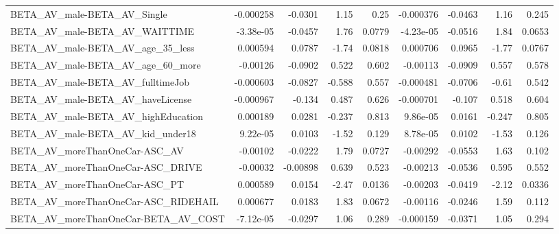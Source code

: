 \begin{tabular}{lrrrrrrrr}
BETA\_AV\_male-BETA\_AV\_Single                        &   -0.000258 &      -0.0301 &     1.15 &     0.25 &  -0.000376 &     -0.0463 &         1.16 &         0.245 \\
BETA\_AV\_male-BETA\_AV\_WAITTIME                      &   -3.38e-05 &      -0.0457 &     1.76 &   0.0779 &  -4.23e-05 &     -0.0516 &         1.84 &        0.0653 \\
BETA\_AV\_male-BETA\_AV\_age\_35\_less                   &    0.000594 &       0.0787 &    -1.74 &   0.0818 &   0.000706 &      0.0965 &        -1.77 &        0.0767 \\
BETA\_AV\_male-BETA\_AV\_age\_60\_more                   &    -0.00126 &      -0.0902 &    0.522 &    0.602 &   -0.00113 &     -0.0909 &        0.557 &         0.578 \\
BETA\_AV\_male-BETA\_AV\_fulltimeJob                   &   -0.000603 &      -0.0827 &   -0.588 &    0.557 &  -0.000481 &     -0.0706 &        -0.61 &         0.542 \\
BETA\_AV\_male-BETA\_AV\_haveLicense                   &   -0.000967 &       -0.134 &    0.487 &    0.626 &  -0.000701 &      -0.107 &        0.518 &         0.604 \\
BETA\_AV\_male-BETA\_AV\_highEducation                 &    0.000189 &       0.0281 &   -0.237 &    0.813 &   9.86e-05 &      0.0161 &       -0.247 &         0.805 \\
BETA\_AV\_male-BETA\_AV\_kid\_under18                   &    9.22e-05 &       0.0103 &    -1.52 &    0.129 &   8.78e-05 &      0.0102 &        -1.53 &         0.126 \\
BETA\_AV\_moreThanOneCar-ASC\_AV                      &    -0.00102 &      -0.0222 &     1.79 &   0.0727 &   -0.00292 &     -0.0553 &         1.63 &         0.102 \\
BETA\_AV\_moreThanOneCar-ASC\_DRIVE                   &    -0.00032 &     -0.00898 &    0.639 &    0.523 &   -0.00213 &     -0.0536 &        0.595 &         0.552 \\
BETA\_AV\_moreThanOneCar-ASC\_PT                      &    0.000589 &       0.0154 &    -2.47 &   0.0136 &   -0.00203 &     -0.0419 &        -2.12 &        0.0336 \\
BETA\_AV\_moreThanOneCar-ASC\_RIDEHAIL                &    0.000677 &       0.0183 &     1.83 &   0.0672 &   -0.00116 &     -0.0246 &         1.59 &         0.112 \\
BETA\_AV\_moreThanOneCar-BETA\_AV\_COST                &   -7.12e-05 &      -0.0297 &     1.06 &    0.289 &  -0.000159 &     -0.0371 &         1.05 &         0.294 \\

\end{tabular}
